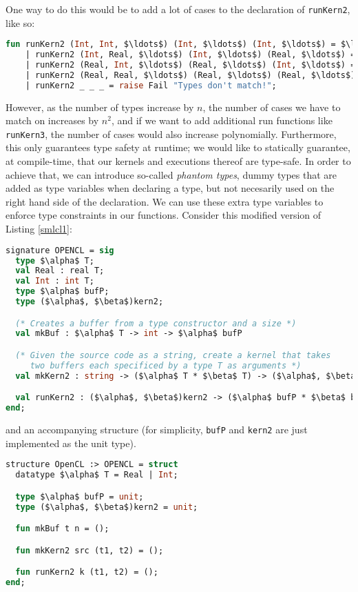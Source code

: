 One way to do this would be to add a lot of cases to the declaration
of \texttt{runKern2}, like so:

\begin{lstlisting}[language=ML, caption=Casing on runKern2,
    label=runKern,mathescape]
  fun runKern2 (Int, Int, $\ldots$) (Int, $\ldots$) (Int, $\ldots$) = $\ldots$
    | runKern2 (Int, Real, $\ldots$) (Int, $\ldots$) (Real, $\ldots$) = $\ldots$
    | runKern2 (Real, Int, $\ldots$) (Real, $\ldots$) (Int, $\ldots$) = $\ldots$
    | runKern2 (Real, Real, $\ldots$) (Real, $\ldots$) (Real, $\ldots$) = $\ldots$
    | runKern2 _ _ _ = raise Fail "Types don't match!";
\end{lstlisting}

However, as the number of types increase by $n$, the number of cases
we have to match on increases by $n^2$, and if we want to add
additional run functions like \texttt{runKern3}, the number of cases
would also increase polynomially. Furthermore, this only guarantees
type safety at runtime; we would like to statically guarantee, at
compile-time, that our kernels and executions thereof are
type-safe. In order to achieve that, we can introduce so-called
\emph{phantom types}, dummy types that are added as type variables
when declaring a type, but not necesarily used on the right hand side
of the declaration. We can use these extra type variables to enforce
type constraints in our functions. Consider this modified version of
Listing \ref{smlcl1}:

\begin{lstlisting}[language=ML, caption=Adding type
    variables,label=smlcl2,mathescape]
signature OPENCL = sig
  type $\alpha$ T;
  val Real : real T;
  val Int : int T;
  type $\alpha$ bufP;
  type ($\alpha$, $\beta$)kern2;

  (* Creates a buffer from a type constructor and a size *)
  val mkBuf : $\alpha$ T -> int -> $\alpha$ bufP

  (* Given the source code as a string, create a kernel that takes
     two buffers each specificed by a type T as arguments *)
  val mkKern2 : string -> ($\alpha$ T * $\beta$ T) -> ($\alpha$, $\beta$)kern2

  val runKern2 : ($\alpha$, $\beta$)kern2 -> ($\alpha$ bufP * $\beta$ bufP) -> unit
end;
\end{lstlisting}

and an accompanying structure (for simplicity, \texttt{bufP} and
\texttt{kern2} are just implemented as the unit type).

\begin{lstlisting}[language=ML, caption=Structure with phantom types,mathescape]
structure OpenCL :> OPENCL = struct
  datatype $\alpha$ T = Real | Int;

  type $\alpha$ bufP = unit;
  type ($\alpha$, $\beta$)kern2 = unit;

  fun mkBuf t n = ();

  fun mkKern2 src (t1, t2) = ();

  fun runKern2 k (t1, t2) = ();
end;
\end{lstlisting}

